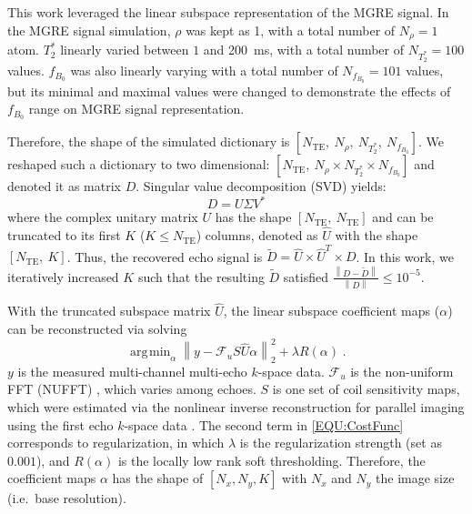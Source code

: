 \documentclass[a4paper,11pt]{article}
\DeclareMathOperator*{\argmin}{\arg\!\min}
\newcommand*{\norm}[1]{\left\lVert#1\right\rVert}
\begin{document}
This work leveraged the linear subspace representation of the MGRE signal.
In the MGRE signal simulation, $\rho$ was kept as 1,
with a total number of $N_\rho = 1$ atom.
$T_2^*$ linearly varied between $1$ and \SI{200}{ms},
with a total number of $N_{T_2^*} = 100$ values.
$f_{B_0}$ was also linearly varying with a total number of $N_{f_{B_0}} = 101$ values,
but its minimal and maximal values were changed to
demonstrate the effects of $f_{B_0}$ range on MGRE signal representation.

Therefore, the shape of the simulated dictionary is
$[N_\text{TE},~ N_\rho,~ N_{T_2^*},~ N_{f_{B_0}}]$.
We reshaped such a dictionary to two dimensional:
$[N_\text{TE},~ N_\rho \times N_{T_2^*} \times N_{f_{B_0}}]$
and denoted it as matrix $D$.
Singular value decomposition (SVD) yields:
\begin{equation}
	D = U \Sigma V^*
\end{equation}
where the complex unitary matrix $U$ has the shape $[N_\text{TE},~ N_\text{TE}]$
and can be truncated to its first $K$ ($K \leq N_\text{TE}$) columns,
denoted as $\hat{U}$ with the shape $[N_\text{TE},~ K]$.
Thus, the recovered echo signal is
$\tilde{D} = \hat{U} \times \hat{U}^T \times D$.
In this work, we iteratively increased $K$
such that the resulting $\tilde{D}$ satisfied
$\frac{\norm{D - \tilde{D}}}{\norm{D}} \leq 10^{-5}$.

With the truncated subspace matrix $\hat{U}$, the linear subspace coefficient maps ($\alpha$)
can be reconstructed via solving
\begin{equation}
	\argmin_\alpha \norm{y - \mathcal{F}_u S \hat{U} \alpha}_2^2 + \lambda R(\alpha) \; .
	\label{EQU:CostFunc}
\end{equation}
$y$ is the measured multi-channel multi-echo $k$-space data.
$\mathcal{F}_u$ is the non-uniform FFT (NUFFT)
\cite{fessler_2003_nufft,beatty_2005_nufft}, which varies among echoes.
$S$ is one set of coil sensitivity maps,
which were estimated via the nonlinear inverse reconstruction for parallel imaging
using the first echo $k$-space data \cite{uecker_2008_nlinv}.
The second term in \cref{EQU:CostFunc} corresponds to regularization,
in which $\lambda$ is the regularization strength (set as $0.001$),
and $R(\alpha)$ is the locally low rank soft thresholding.
Therefore, the coefficient maps $\alpha$ has the shape of $[N_x, N_y, K]$
with $N_x$ and $N_y$ the image size (i.e.~base resolution).
\end{document}
